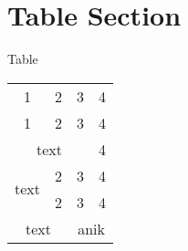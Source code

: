 \section{Table Section}
\begin{frame}{Table}
\begin{tabular}{|c|c|c|c|}
    \hline
	1 & 2 & 3 & 4 \\ 
	\cline{1-3}
	1 & 2 & 3 & 4  \\
	\hline
	\multicolumn{3}{|c|}{text} & 4 \\
	\hline
	\multirow{2}{*}{text} & 2 & 3 & 4\\
	\cline{2-4}
	& 2 & 3 & 4 \\
	\hline
	\multicolumn{2}{|c|}{\multirow{2}{*}{text}} & \multicolumn{2}{|c|}{\multirow{2}{*}{anik}} \\
	\multicolumn{2}{|c|}{} & \multicolumn{2}{|c|}{} \\
	\hline
\end{tabular}
\end{frame}